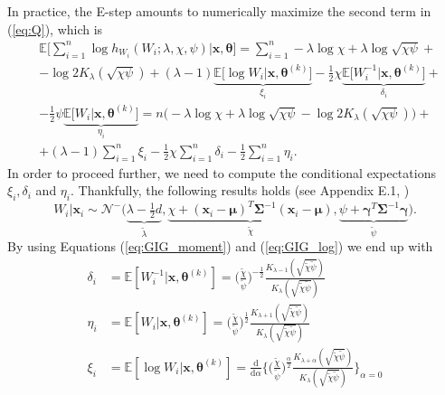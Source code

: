 In practice, the E-step amounts to numerically maximize the second term in (\ref{eq:Q}), which is
\begin{align}\label{eq:ML_function_second_term}
&\mathbb{E}\bigg[\sum_{i=1}^{n}\log h_{W_i}(W_i;\lambda,\chi,\psi)\Big| \bm{x},\bm{\theta}\bigg]  = \sum_{i=1}^{n} -\lambda\log \chi + \lambda\log \sqrt{\chi\psi}+ \\\nonumber
&  -\log 2K_{\lambda}(\sqrt{\chi\psi}) + (\lambda-1)\underbrace{\mathbb{E}\big[\log W_i \lvert \bm{x},\bm{\theta}^{(k)}\big]}_{\xi_i}-\tfrac{1}{2}\chi\underbrace{\mathbb{E}\big[W_i^{-1} \lvert \bm{x},\bm{\theta}^{(k)}\big]}_{\delta_i} + \\\nonumber
& -\tfrac{1}{2}\psi\underbrace{\mathbb{E}\big[W_i \lvert \bm{x},\bm{\theta}^{(k)}\big]}_{\eta_i} = n\big(-\lambda\log \chi + \lambda\log \sqrt{\chi\psi}-\log 2K_{\lambda}(\sqrt{\chi\psi})\big) + \\\nonumber
&+(\lambda-1)\sum_{i=1}^{n}\xi_i-\tfrac{1}{2}\chi\sum_{i=1}^{n}\delta_i-\tfrac{1}{2}\sum_{i=1}^{n}\eta_i.
\end{align}
In order to proceed further, we need to compute the conditional expectations $\xi_i,\delta_i$ and $\eta_i$. Thankfully, the following results holds (see Appendix E.1, \cite{Brey2013})
\[  W_i\lvert \bm{x}_i \sim \mathcal{N}^-\big(\underbrace{\lambda-\tfrac{1}{2}d}_{\widetilde{\lambda}},\underbrace{\chi + (\bm{x}_i-\bm{\mu})^T \bm{\Sigma}^{-1}(\bm{x}_i-\bm{\mu})}_{\widetilde{\chi}},\underbrace{\psi+\bm{\gamma}^T\bm{\Sigma}^{-1}\bm{\gamma}}_{\widetilde{\psi}}\big). \]
By using Equations (\ref{eq:GIG_moment}) and (\ref{eq:GIG_log}) we end up with
\begin{align}\label{eq:delta}
\delta_i & = \mathbb{E}[W_i^{-1}\lvert \bm{x},\bm{\theta}^{(k)}] = \Big(\frac{\widetilde{\chi}}{\widetilde{\psi}}\Big)^{-\frac{1}{2}}\frac{K_{\lambda-1}(\sqrt{\widetilde{\chi}\widetilde{\psi}})}{K_{\lambda}(\sqrt{\widetilde{\chi}\widetilde{\psi}})} \\[20pt]
\label{eq:eta}
\eta_i & = \mathbb{E}[W_i\lvert \bm{x},\bm{\theta}^{(k)}] = \Big(\frac{\widetilde{\chi}}{\widetilde{\psi}}\Big)^{\frac{1}{2}}\frac{K_{\lambda+1}(\sqrt{\widetilde{\chi}\widetilde{\psi}})}{K_{\lambda}(\sqrt{\widetilde{\chi}\widetilde{\psi}})}\\[20pt]
\label{eq:csi}
\xi_i & = \mathbb{E}[\log W_i\lvert \bm{x},\bm{\theta}^{(k)}]= \frac{\mathrm{d}}{\mathrm{d}\alpha}\Bigg\{\Big(\frac{\widetilde{\chi}}{\widetilde{\psi}}\Big)^{\frac{\alpha}{2}}\frac{K_{\lambda+\alpha}(\sqrt{\widetilde{\chi}\widetilde{\psi}})}{K_{\lambda}(\sqrt{\widetilde{\chi}\widetilde{\psi}})}\Bigg\}_{\alpha=0}
\end{align}

